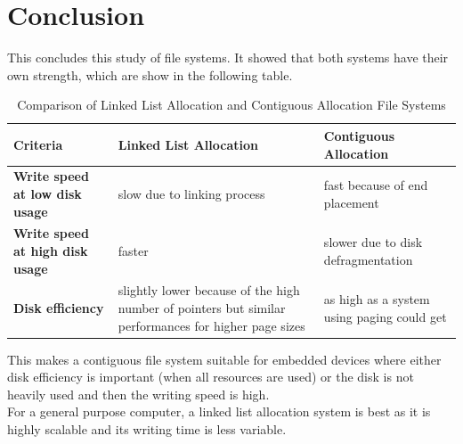 \documentclass[10pt,a4paper]{ULBreport}
\begin{document}
\chapter{Conclusion}
This concludes this study of file systems. It showed that both systems have their own strength, which are show in the following table.

\begin{table}[H]
    \centering
    \begin{tabular}{|l|p{5cm}|p{5cm}|}
        \hline
        \textbf{Criteria} & \textbf{Linked List Allocation} & \textbf{Contiguous Allocation} \\ \hline
        \textbf{Write speed at low disk usage} & 
        slow due to linking process & 
        fast because of end placement \\ \hline
        \textbf{Write speed at high disk usage} & 
        faster & 
        slower due to disk defragmentation \\ \hline
        \textbf{Disk efficiency} & 
        slightly lower because of the high number of pointers but similar performances for higher page sizes & 
        as high as a system using paging could get \\ \hline
    \end{tabular}
    \caption{Comparison of Linked List Allocation and Contiguous Allocation File Systems}
    \label{tab:comparison}
\end{table}

This makes a contiguous file system suitable for embedded devices where either disk efficiency is important (when all resources are used) or the disk is not heavily used and then the writing speed is high. \\
For a general purpose computer, a linked list allocation system is best as it is highly scalable and its writing time is less variable.



\end{document}
